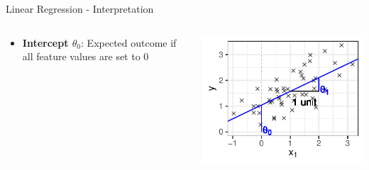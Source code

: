 \documentclass[10pt,compress,t,notes=noshow, xcolor=table]{beamer}
\begin{document}
\begin{frame}{Linear Regression - Interpretation}
\begin{columns}[T, totalwidth = \textwidth]
\begin{column}{0.67\textwidth}
\begin{itemize}
        \item<4> \textbf{Intercept $\theta_0$}: Expected outcome if all feature values are set to 0 %
    \end{itemize}
\end{column}
\begin{column}{0.33\textwidth}
        \includegraphics[trim={0 5 0 5},clip, width = \textwidth]{figure/reg_lm_plot_interpreted.pdf}\\
\end{column}
\end{columns}
    
\end{frame}
\end{document}
